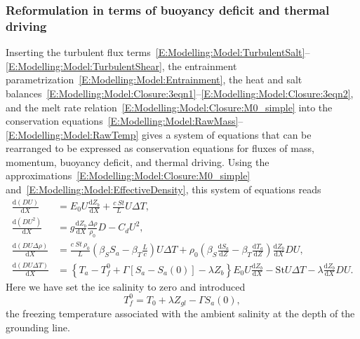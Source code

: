 \documentclass{jfm}
\newcommand{\dd}[2]{\frac{\mathrm{d} #1}{\mathrm{d} #2}}
\begin{document}
\subsubsection{Reformulation in terms of buoyancy deficit and thermal driving}
Inserting the turbulent flux terms~\eqref{E:Modelling:Model:TurbulentSalt}--\eqref{E:Modelling:Model:TurbulentShear}, the entrainment parametrization~\eqref{E:Modelling:Model:Entrainment}, the heat and salt balances~\eqref{E:Modelling:Model:Closure:3eqn1}--\eqref{E:Modelling:Model:Closure:3eqn2}, and the melt rate relation~\eqref{E:Modelling:Model:Closure:M0_simple} into the conservation equations~\eqref{E:Modelling:Model:RawMass}--\eqref{E:Modelling:Model:RawTemp} gives a system of equations that can be rearranged to be expressed as conservation equations for fluxes of mass, momentum, buoyancy deficit, and thermal driving. Using the approximations~\eqref{E:Modelling:Model:Closure:M0_simple} and~\eqref{E:Modelling:Model:EffectiveDensity}, this system of equations reads
\begin{align}
\dd{(DU)}{X} &= E_0 U \dd{Z_b}{X}+ \frac{c~\textit{St}}{L}U\Delta T,\label{E:Modelling:Model:Mass}\\
\dd{(DU^2)}{X} &= g \dd{Z_b}{X} \frac{\Delta \rho }{\rho_0} D - C_d U^2, \label{E:Modelling:Model:Mom}\\
\dd{(DU\Delta \rho)}{X} &= \frac{c~\textit{St}~\rho_0}{L}\left(\beta_S S_a - \beta_T \frac{L}{c}\right) U\Delta T + \rho_0\left(\beta_S \dd{S_a}{Z}-\beta_T \dd{T_a}{Z}\right) \dd{Z_b}{X} DU, \label{E:Modelling:Model:Buoyancy}\\
\dd{(DU\Delta T)}{X} &= \left\{T_a - T_{f}^0 + \Gamma \left[S_a - S_a(0)\right] - \lambda Z_b\right\}E_0 U \dd{Z_b}{X} - \mathrm{St}U \Delta T - \lambda \dd{Z_b}{X} DU.
\label{E:Modelling:Model:Thermal}
\end{align}
Here we have set the ice salinity to zero and introduced
\begin{equation}
T_{f}^0 = T_0 + \lambda Z_{gl} - \Gamma S_a(0),
\end{equation}
the freezing temperature associated with the ambient salinity at the depth of the grounding line.
\end{document}
